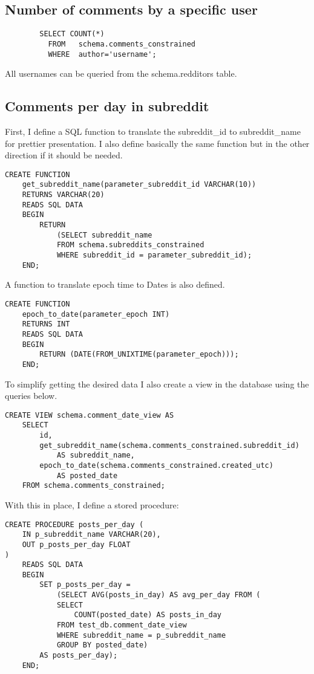 \subsection {Number of comments by a specific user}\label{subsec:comments-by-user}
    \begin{verbatim}
        SELECT COUNT(*)
          FROM   schema.comments_constrained
          WHERE  author='username';
    \end{verbatim}
    All usernames can be queried from the schema.redditors table.

\subsection{Comments per day in subreddit}\label{subsec:comments-per-day}
    First, I define a SQL function to translate the subreddit\_id to subreddit\_name for prettier presentation.
    I also define basically the same function but in the other direction if it should be needed.

    \begin{verbatim}
CREATE FUNCTION
    get_subreddit_name(parameter_subreddit_id VARCHAR(10))
    RETURNS VARCHAR(20)
    READS SQL DATA
    BEGIN
        RETURN
            (SELECT subreddit_name
            FROM schema.subreddits_constrained
            WHERE subreddit_id = parameter_subreddit_id);
    END;
    \end{verbatim}
    A function to translate epoch time to Dates is also defined.
    \begin{verbatim}
CREATE FUNCTION
    epoch_to_date(parameter_epoch INT)
    RETURNS INT
    READS SQL DATA
    BEGIN
        RETURN (DATE(FROM_UNIXTIME(parameter_epoch)));
    END;
    \end{verbatim}
    To simplify getting the desired data I also create a view in the database using the queries below.
    \begin{verbatim}
CREATE VIEW schema.comment_date_view AS
    SELECT
        id,
        get_subreddit_name(schema.comments_constrained.subreddit_id)
            AS subreddit_name,
        epoch_to_date(schema.comments_constrained.created_utc)
            AS posted_date
    FROM schema.comments_constrained;
    \end{verbatim}

    With this in place, I define a stored procedure:
    \begin{verbatim}
CREATE PROCEDURE posts_per_day (
    IN p_subreddit_name VARCHAR(20),
    OUT p_posts_per_day FLOAT
)
    READS SQL DATA
    BEGIN
        SET p_posts_per_day =
            (SELECT AVG(posts_in_day) AS avg_per_day FROM (
            SELECT
                COUNT(posted_date) AS posts_in_day
            FROM test_db.comment_date_view
            WHERE subreddit_name = p_subreddit_name
            GROUP BY posted_date)
        AS posts_per_day);
    END;
    \end{verbatim}

